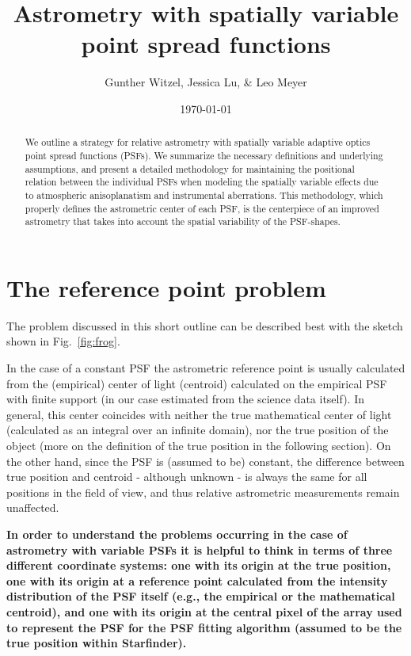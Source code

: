 \documentclass[a4paper]{article}
\title{Astrometry with spatially variable point spread functions}
\author{Gunther Witzel, Jessica Lu, \& Leo Meyer}
\date{\today}
\begin{document}
\maketitle

\begin{abstract}
We outline a strategy for relative astrometry with spatially variable adaptive optics point spread functions (PSFs). We summarize the necessary definitions and underlying assumptions, and present a detailed methodology for maintaining the positional relation between the individual PSFs when modeling the spatially variable effects due to atmospheric anisoplanatism and instrumental aberrations. This methodology, which properly defines the astrometric center of each PSF, is the centerpiece of an improved astrometry that takes into account the spatial variability of the PSF-shapes.
\end{abstract}

\section{The reference point problem}

The problem discussed in this short outline can be described best with the sketch shown in Fig.~\ref{fig:frog}. 

In the case of a constant PSF the astrometric reference point is usually calculated from the (empirical) center of light (centroid) calculated on the empirical PSF with finite support (in our case estimated from the science data itself). In general, this center coincides with neither the true mathematical center of light (calculated as an integral over an infinite domain), nor the true position of the object (more on the definition of the true position in the following section). On the other hand, since the PSF is (assumed to be) constant, the difference between true position and centroid - although unknown - is always the same for all positions in the field of view, and thus relative astrometric measurements remain unaffected.

{\bf In order to understand the problems occurring in the case of astrometry with variable PSFs it is helpful to think in terms of three different coordinate systems: one with its origin at the true position, one with its origin at a reference point calculated from the intensity distribution of the PSF itself (e.g., the empirical or the mathematical centroid), and one with its origin at the central pixel of the array used to represent the PSF for the PSF fitting algorithm (assumed to be the true position within Starfinder).}
\end{document}
